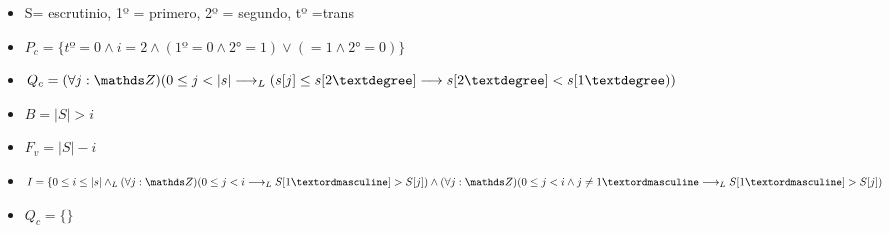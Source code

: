 \documentclass[10pt,a4paper]{article}
\begin{document}
\begin{itemize}
	\item  S= escrutinio, 1º = primero, 2º = segundo, tº =trans
      \item $P_c = \{ tº=0 \land i=2 \land (1º=0 \land 2° = 1) \lor ( = 1 \land 2°=0) \}$
\item $Q_c = (\forall j:\ent)( 0\leq j < |s| \longrightarrow_{L} ( s[j]\leq s[2°] \longrightarrow s[2°]<s[1°))$
	\item $B = |S| > i$ 
	\item $F_v = |S| - i$
	\item $I = \{0 \leq i \leq |s| \land_{L} (\forall j:\ent)(0 \leq j < i \longrightarrow_{L} S[1º]>S[j]) \land (\forall j:\ent)(0 \leq j < i \land j \neq 1º \longrightarrow_{L} S[1º]>S[j])$
        \item $Q_c = \{ \}$
\end{itemize}
\end{document}
